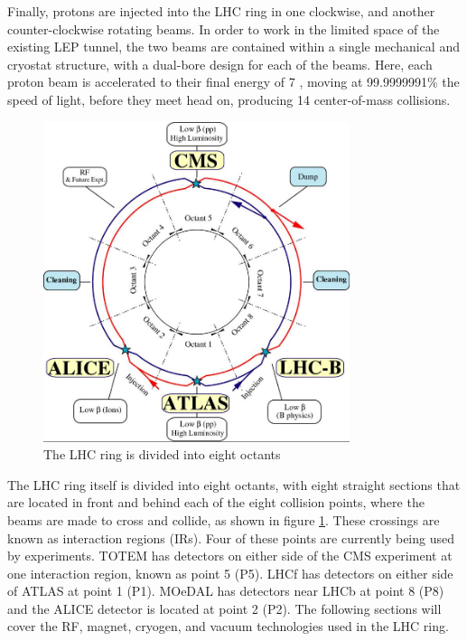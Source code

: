 \par Finally, protons are injected into the LHC ring in one clockwise,
and another counter-clockwise rotating beams.  In order to work in the
limited space of the existing LEP tunnel, the two beams are contained
within a single mechanical and cryostat structure, with a dual-bore
design for each of the beams.  Here, each proton beam is
accelerated to their final energy of 7 \TeV, moving at 99.9999991$\%$
the speed of light, before they meet head on, producing 14 \TeV
center-of-mass collisions.  

\begin{figure}[h]
   \centering
  \includegraphics[width=0.8\textwidth]{Figures/LHC_Diagrams/LHC_Octant.jpg}
  \caption{The LHC ring is divided into eight octants \cite{lhc:machine_description}} \label{fig:lhc_octants}
\end{figure}

\par The LHC ring itself is divided into eight octants, with eight
straight sections that are located in front and behind each of the
eight collision points, where the beams are made to cross and
collide, as shown in figure \ref{fig:lhc_octants}.  These crossings
are known as interaction regions (IRs).  Four of these points are
currently being used by experiments.  TOTEM has detectors on either
side of the CMS experiment at one interaction region, known as point 5
(P5).  LHCf has detectors on either side of ATLAS at point 1 (P1).
MOeDAL has detectors near LHCb at point 8 (P8) and the ALICE detector
is located at point 2 (P2).  The following sections will cover the RF,
magnet, cryogen, and vacuum technologies used in the LHC ring.  


